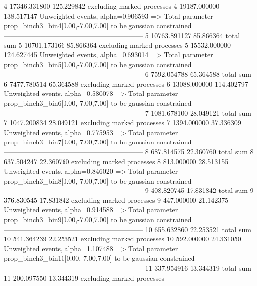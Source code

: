 4          17346.331800    125.229842      excluding marked processes    
4          19187.000000    138.517147      Unweighted events, alpha=0.906593
  => Total parameter prop_binch3_bin4[0.00,-7.00,7.00] to be gaussian constrained
------------------------------------------------------------
5          10763.891127    85.866364       total sum                     
5          10701.173166    85.866364       excluding marked processes    
5          15532.000000    124.627445      Unweighted events, alpha=0.693014
  => Total parameter prop_binch3_bin5[0.00,-7.00,7.00] to be gaussian constrained
------------------------------------------------------------
6          7592.054788     65.364588       total sum                     
6          7477.780514     65.364588       excluding marked processes    
6          13088.000000    114.402797      Unweighted events, alpha=0.580078
  => Total parameter prop_binch3_bin6[0.00,-7.00,7.00] to be gaussian constrained
------------------------------------------------------------
7          1081.678100     28.049121       total sum                     
7          1047.200834     28.049121       excluding marked processes    
7          1394.000000     37.336309       Unweighted events, alpha=0.775953
  => Total parameter prop_binch3_bin7[0.00,-7.00,7.00] to be gaussian constrained
------------------------------------------------------------
8          687.814575      22.360760       total sum                     
8          637.504247      22.360760       excluding marked processes    
8          813.000000      28.513155       Unweighted events, alpha=0.846020
  => Total parameter prop_binch3_bin8[0.00,-7.00,7.00] to be gaussian constrained
------------------------------------------------------------
9          408.820745      17.831842       total sum                     
9          376.830545      17.831842       excluding marked processes    
9          447.000000      21.142375       Unweighted events, alpha=0.914588
  => Total parameter prop_binch3_bin9[0.00,-7.00,7.00] to be gaussian constrained
------------------------------------------------------------
10         655.632860      22.253521       total sum                     
10         541.364239      22.253521       excluding marked processes    
10         592.000000      24.331050       Unweighted events, alpha=1.107488
  => Total parameter prop_binch3_bin10[0.00,-7.00,7.00] to be gaussian constrained
------------------------------------------------------------
11         337.954916      13.344319       total sum                     
11         200.097550      13.344319       excluding marked processes    
